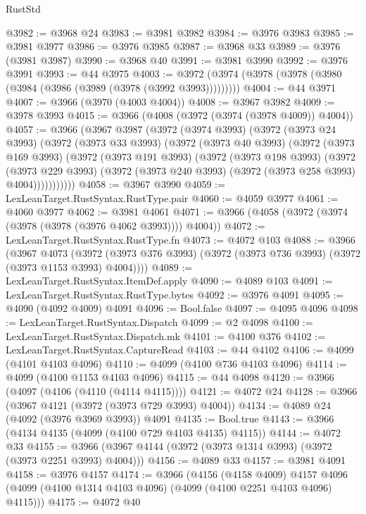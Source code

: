 \begin{lexlean}{RustStd}
\begin{coremodule}
@3982 := @3968 @24
@3983 := @3981 @3982
@3984 := @3976 @3983
@3985 := @3981 @3977
@3986 := @3976 @3985
@3987 := @3968 @33
@3989 := @3976 (@3981 @3987)
@3990 := @3968 @40
@3991 := @3981 @3990
@3992 := @3976 @3991
@3993 := @44 @3975
@4003 := @3972 (@3974 (@3978 (@3978 (@3980 (@3984 (@3986 (@3989 (@3978 (@3992 @3993)))))))))
@4004 := @44 @3971
@4007 := @3966 (@3970 (@4003 @4004))
@4008 := @3967 @3982
@4009 := @3978 @3993
@4015 := @3966 (@4008 (@3972 (@3974 (@3978 @4009)) @4004))
@4057 := @3966
    (@3967
      @3987
      (@3972
        (@3974 @3993)
        (@3972
          (@3973 @24 @3993)
          (@3972
            (@3973 @33 @3993)
            (@3972
              (@3973 @40 @3993)
              (@3972
                (@3973 @169 @3993)
                (@3972
                  (@3973 @191 @3993)
                  (@3972
                    (@3973 @198 @3993)
                    (@3972
                      (@3973 @229 @3993)
                      (@3972 (@3973 @240 @3993) (@3972 (@3973 @258 @3993) @4004)))))))))))
@4058 := @3967 @3990
@4059 := LexLeanTarget.RustSyntax.RustType.pair
@4060 := @4059 @3977
@4061 := @4060 @3977
@4062 := @3981 @4061
@4071 := @3966 (@4058 (@3972 (@3974 (@3978 (@3978 (@3976 @4062 @3993)))) @4004))
@4072 := LexLeanTarget.RustSyntax.RustType.fn
@4073 := @4072 @103
@4088 := @3966
    (@3967
      @4073
      (@3972 (@3973 @376 @3993) (@3972 (@3973 @736 @3993) (@3972 (@3973 @1153 @3993) @4004))))
@4089 := LexLeanTarget.RustSyntax.ItemDef.apply
@4090 := @4089 @103
@4091 := LexLeanTarget.RustSyntax.RustType.bytes
@4092 := @3976 @4091
@4095 := @4090 (@4092 @4009) @4091
@4096 := Bool.false
@4097 := @4095 @4096
@4098 := LexLeanTarget.RustSyntax.Dispatch
@4099 := @2 @4098
@4100 := LexLeanTarget.RustSyntax.Dispatch.mk
@4101 := @4100 @376
@4102 := LexLeanTarget.RustSyntax.CaptureRead
@4103 := @44 @4102
@4106 := @4099 (@4101 @4103 @4096)
@4110 := @4099 (@4100 @736 @4103 @4096)
@4114 := @4099 (@4100 @1153 @4103 @4096)
@4115 := @44 @4098
@4120 := @3966 (@4097 (@4106 (@4110 (@4114 @4115))))
@4121 := @4072 @24
@4128 := @3966 (@3967 @4121 (@3972 (@3973 @729 @3993) @4004))
@4134 := @4089 @24 (@4092 (@3976 @3969 @3993)) @4091
@4135 := Bool.true
@4143 := @3966 (@4134 @4135 (@4099 (@4100 @729 @4103 @4135) @4115))
@4144 := @4072 @33
@4155 := @3966 (@3967 @4144 (@3972 (@3973 @1314 @3993) (@3972 (@3973 @2251 @3993) @4004)))
@4156 := @4089 @33
@4157 := @3981 @4091
@4158 := @3976 @4157
@4174 := @3966
    (@4156
      (@4158 @4009)
      @4157
      @4096
      (@4099 (@4100 @1314 @4103 @4096) (@4099 (@4100 @2251 @4103 @4096) @4115)))
@4175 := @4072 @40

\end{coremodule}
\end{lexlean}
